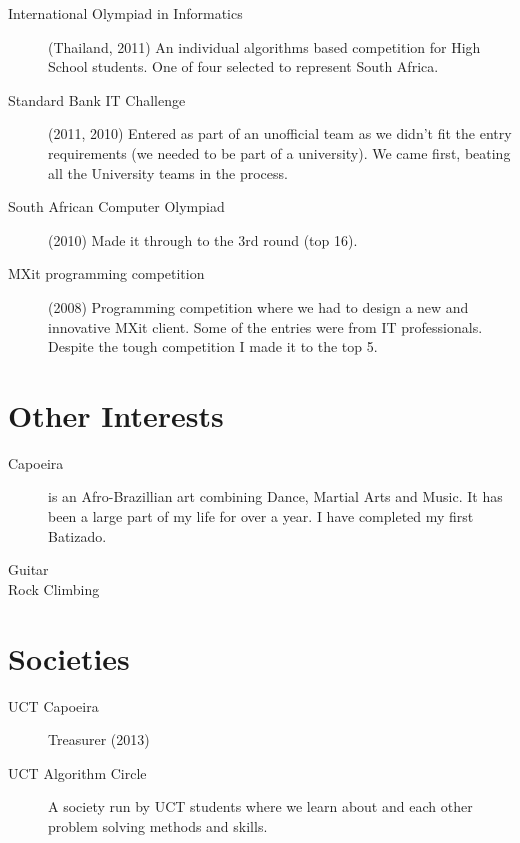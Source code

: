 \documentclass[margin,line,a4paper]{resume}
\begin{document}
\begin{resume}
\begin{description}
                \item [International Olympiad in Informatics] (Thailand, 2011) An individual 
                algorithms based competition for High School students. One of four selected
                to represent South Africa.

                \item [Standard Bank IT Challenge] (2011, 2010) Entered as part of an unofficial team
                as we didn't fit the entry requirements (we needed to be part of a university).
                We came first, beating all the University teams in the process.

                \item [South African Computer Olympiad] (2010) Made it through to the 3rd
                round (top 16).

                \item [MXit programming competition] (2008) Programming competition where we
                had to design a new and innovative MXit client.  Some of the
                entries were from IT professionals. Despite the tough competition I made it to the top 5.
            \end{description}

        \section{\mysidestyle Other Interests}
            \begin{description}
                \item[Capoeira] is an Afro-Brazillian art combining Dance, Martial Arts and Music. It has
                    been a large part of my life for over a year. I have completed my first Batizado.
                \item[Guitar]
                \item[Rock Climbing]
            \end{description}

        \section{\mysidestyle Societies}
            \begin{description}
                \item [UCT Capoeira] Treasurer (2013)
                \item [UCT Algorithm Circle] A society run by UCT students where we learn about and
                each other problem solving methods and skills.


\end{description}
\end{resume}
\end{document}
